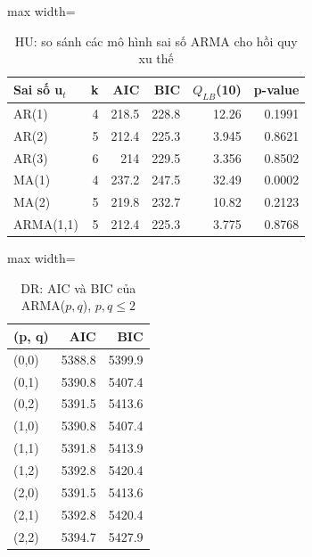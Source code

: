 \begin{table}[H]
\centering\footnotesize
\caption{HU: so sánh các mô hình sai số ARMA cho hồi quy xu thế}\label{tab:tab_b11_13_hu_models}
\begin{adjustbox}{max width=\linewidth}
\begin{tabular}{|l|r|r|r|r|r|}
\toprule
Sai số u$_{t}$ & k & AIC & BIC & $Q_{LB}$(10) & p-value \\
\midrule
AR(1) & 4 & 218.5 & 228.8 & 12.26 & 0.1991 \\
AR(2) & 5 & 212.4 & 225.3 & 3.945 & 0.8621 \\
AR(3) & 6 & 214 & 229.5 & 3.356 & 0.8502 \\
MA(1) & 4 & 237.2 & 247.5 & 32.49 & 0.0002 \\
MA(2) & 5 & 219.8 & 232.7 & 10.82 & 0.2123 \\
ARMA(1,1) & 5 & 212.4 & 225.3 & 3.775 & 0.8768 \\
\bottomrule
\end{tabular}
\end{adjustbox}\par{}
\end{table}
\begin{table}[H]
\centering\footnotesize
\caption{DR: AIC và BIC của ARMA($p,q$), $p,q\le2$}\label{tab:tab_b11_13_dr_grid}
\begin{adjustbox}{max width=\linewidth}
\begin{tabular}{|l|r|r|}
\toprule
(p, q) & AIC & BIC \\
\midrule
(0,0) & 5388.8 & 5399.9 \\
(0,1) & 5390.8 & 5407.4 \\
(0,2) & 5391.5 & 5413.6 \\
(1,0) & 5390.8 & 5407.4 \\
(1,1) & 5391.8 & 5413.9 \\
(1,2) & 5392.8 & 5420.4 \\
(2,0) & 5391.5 & 5413.6 \\
(2,1) & 5392.8 & 5420.4 \\
(2,2) & 5394.7 & 5427.9 \\
\bottomrule
\end{tabular}
\end{adjustbox}
\end{table}
